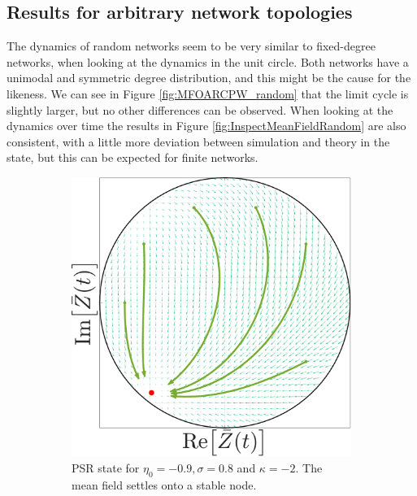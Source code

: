 \subsection{Results for arbitrary network topologies} \label{sec:resArbNetw}
The dynamics of random networks seem to be very similar to fixed-degree networks, when looking at the dynamics in the unit circle. Both networks have a unimodal and symmetric degree distribution, and this might be the cause for the likeness. We can see in Figure \ref{fig:MFOARCPW_random} that the limit cycle is slightly larger, but no other differences can be observed. When looking at the dynamics over time the results in Figure \ref{fig:InspectMeanFieldRandom} are also consistent, with a little more deviation between simulation and theory in the \CPW state, but this can be expected for finite networks.
\begin{figure}[H]
\centering
\begin{subfigure}[b]{0.32\linewidth}
   \centering
  \includegraphics[width=\linewidth]{../Figures/PhaseSpace/MFOARPSR_random.pdf}
   \caption{PSR state for $\eta_0 = -0.9, \sigma = 0.8$ and $\kappa= -2$. The mean field settles onto a stable node.}
   \label{fig:MFOARPSR_random} 
\end{subfigure} \hfill
\begin{subfigure}[b]{0.32\linewidth}
   \centering

\end{subfigure}
\end{figure}
